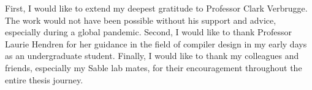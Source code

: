 First, I would like to extend my deepest gratitude to Professor Clark Verbrugge.
The work would not have been possible without his support and advice, especially
during a global pandemic. Second, I would like to thank Professor
Laurie Hendren for her guidance in the field of compiler design in my early days
as an undergraduate student. Finally, I would like to thank my colleagues and
friends, especially my Sable lab mates, for their encouragement throughout the
entire thesis journey.
